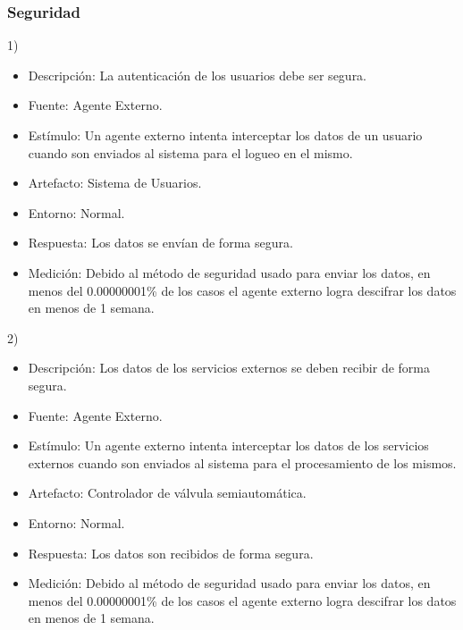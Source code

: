 \documentclass{article}
\theoremstyle{definition}
\theoremstyle{remark}
\begin{document}
\subsubsection{Seguridad}
1)
\begin{itemize}
  \item Descripción: La autenticación de los usuarios debe ser segura.
  \item Fuente: Agente Externo.
  \item Estímulo: Un agente externo intenta interceptar los datos de un usuario cuando son enviados al sistema para el logueo en el mismo.
  \item Artefacto: Sistema de Usuarios.
  \item Entorno: Normal.
  \item Respuesta: Los datos se envían de forma segura.
  \item Medición: Debido al método de seguridad usado para enviar los datos, en menos del 0.00000001\% de los casos el agente externo logra descifrar los datos en menos de 1 semana.
\end{itemize}

2)
\begin{itemize}
  \item Descripción: Los datos de los servicios externos se deben recibir de forma segura.
  \item Fuente: Agente Externo.
  \item Estímulo: Un agente externo intenta interceptar los datos de los servicios externos cuando son enviados al sistema para  el procesamiento de los mismos.
  \item Artefacto: Controlador de válvula semiautomática.
  \item Entorno: Normal.
  \item Respuesta: Los datos son recibidos de forma segura.
  \item Medición: Debido al método de seguridad usado para enviar los datos, en menos del 0.00000001\% de los casos el agente externo logra descifrar los datos en menos de 1 semana.
\end{itemize}

\pagebreak
\end{document}
